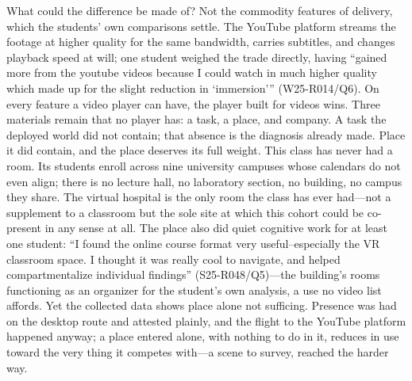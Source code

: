 What could the difference be made of? Not the commodity features of
delivery, which the students' own comparisons settle. The YouTube
platform streams the footage at higher quality for the same bandwidth,
carries subtitles, and changes playback speed at will; one student
weighed the trade directly, having ``gained more from the youtube
videos because I could watch in much higher quality which made up for
the slight reduction in `immersion'{}'' (W25-R014/Q6). On every
feature a video player can have, the player built for videos wins.
Three materials remain that no player has: a task, a place, and
company. A task the deployed world did not contain; that absence is
the diagnosis already made. Place it did contain, and the place
deserves its full weight. This class has never had a room. Its
students enroll across nine university campuses whose calendars do not
even align; there is no lecture hall, no laboratory section, no
building, no campus they share. The virtual hospital is the only room
the class has ever had---not a supplement to a classroom but the sole
site at which this cohort could be co-present in any sense at all. The
place also did quiet cognitive work for at least one student: ``I found
the online course format very useful--especially the VR classroom space.
I thought it was really cool to navigate, and helped compartmentalize
individual findings'' (S25-R048/Q5)---the building's rooms functioning as
an organizer for the student's own analysis, a use no video list affords.
Yet the collected data shows place alone not sufficing. Presence was had
on the desktop route and attested plainly, and the flight to the
YouTube platform happened anyway; a place entered alone, with nothing
to do in it, reduces in use toward the very thing it competes
with---a scene to survey, reached the harder way.

